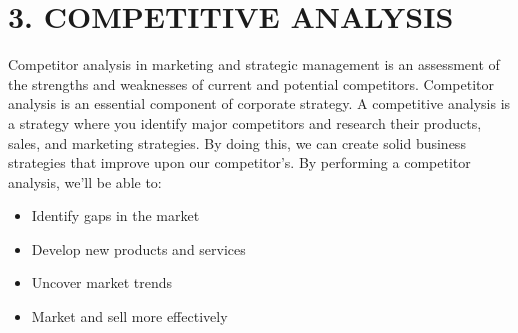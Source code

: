 \section* {\LARGE 3. COMPETITIVE ANALYSIS}
Competitor analysis in marketing and strategic management is an assessment of the strengths and weaknesses of current and potential competitors. Competitor analysis is an essential component of corporate strategy.
A competitive analysis is a strategy where you identify major competitors and research their products, sales, and marketing strategies. By doing this, we can create solid business strategies that improve upon our competitor's. 
By performing a competitor analysis, we'll be able to:
\begin{itemize}
    \item Identify gaps in the market
    \item Develop new products and services
    \item Uncover market trends
    \item Market and sell more effectively
\end{itemize}

